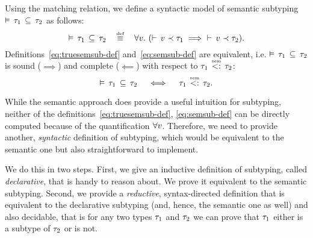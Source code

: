 Using the matching relation, we define a syntactic model of
semantic subtyping $\vDash \, \tau_1 \, \subseteq \, \tau_2$ as follows:
\begin{equation}\label{eq:semsub-def}
\bjsemsub{\ty_1}{\ty_2} \quad \defsign \quad
\forall \vty.\ (\bjmtch{\vty}{\ty_1} \implies\ \bjmtch{\vty}{\ty_2}).
\end{equation}
Definitions~\eqref{eq:truesemsub-def} and~\eqref{eq:semsub-def}
are equivalent, i.e. $\vDash \, \tau_1 \, \subseteq \, \tau_2$ is sound ($\implies$)
and complete ($\impliedby$) with respect to $\bjtruesemsub{\ty_1}{\ty_2}$:
\begin{equation}
\bjsemsub{\ty_1}{\ty_2} \quad \iff \quad \bjtruesemsub{\ty_1}{\ty_2}.
\end{equation}

While the semantic approach does provide a useful intuition for subtyping,
neither of the definitions~\eqref{eq:truesemsub-def}, \eqref{eq:semsub-def} 
can be directly computed because of the quantification $\forall v$.
Therefore, we need to provide another, \emph{syntactic} 
definition of subtyping, which would
be equivalent to the semantic one but also straightforward to implement.

We do this in two steps. 
First, we give an inductive definition of subtyping, 
called \emph{declarative}, that is handy to reason about. 
We prove it equivalent to the semantic subtyping.
Second, we provide a \emph{reductive}, syntax-directed definition that is equivalent to the declarative subtyping 
(and, hence, the semantic one as well)
and also decidable, that is for any two types $\tau_1$ and $\tau_2$
we can prove that $\tau_1$ either is a subtype of $\tau_2$ or is not.
